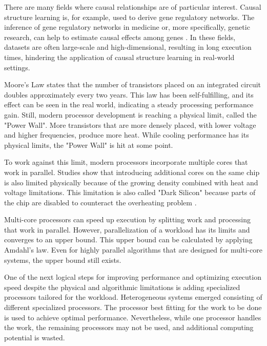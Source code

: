 There are many fields where causal relationships are of particular interest. Causal structure learning is, for example, used to derive gene regulatory networks. The inference of gene regulatory networks in medicine or, more specifically, genetic research, can help to estimate causal effects among genes \cite{rauJointEstimationCausal2013}.
In these fields, datasets are often large-scale and high-dimensional, resulting in long execution times, hindering the application of causal structure learning in real-world settings.

Moore's Law \cite{mooreCrammingMoreComponents2006} states that the number of transistors placed on an integrated circuit doubles approximately every two years. This law has been self-fulfilling, and its effect can be seen in the real world, indicating a steady processing performance gain. Still, modern processor development is reaching a physical limit, called the "Power Wall". More transistors that are more densely placed, with lower voltage and higher frequencies, produce more heat. While cooling performance has its physical limits, the "Power Wall" is hit at some point.

To work against this limit, modern processors incorporate multiple cores that work in parallel. Studies show that introducing additional cores on the same chip is also limited physically because of the growing density combined with heat and voltage limitations. This limitation is also called "Dark Silicon" because parts of the chip are disabled to counteract the overheating problem \cite{esmaeilzadehDarkSiliconEnd2011}.

Multi-core processors can speed up execution by splitting work and processing that work in parallel. However, parallelization of a workload has its limits and converges to an upper bound. This upper bound can be calculated by applying Amdahl's law\cite{amdahlValiditySingleProcessor1967}. Even for highly parallel algorithms that are designed for multi-core systems, the upper bound still exists.

One of the next logical steps for improving performance and optimizing execution speed despite the physical and algorithmic limitations is adding specialized processors tailored for the workload. Heterogeneous systems emerged consisting of different specialized processors. The processor best fitting for the work to be done is used to achieve optimal performance. Nevertheless, while one processor handles the work, the remaining processors may not be used, and additional computing potential is wasted.

